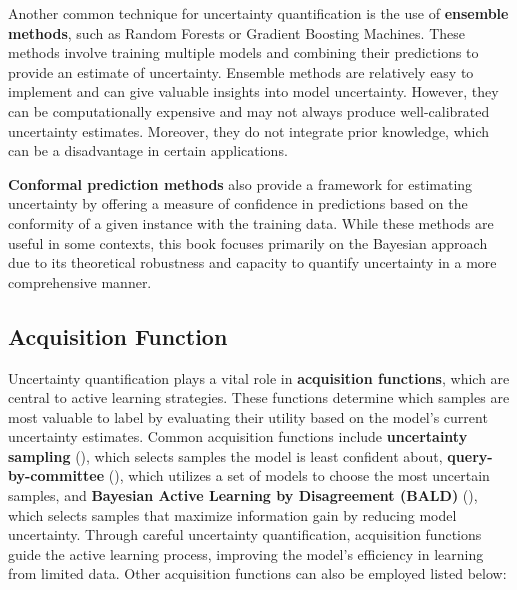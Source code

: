 \documentclass[
  letterpaper,
  numbers=noenddot,
  DIV=11,
  oneside]{scrreprt}
\theoremstyle{remark}
\begin{document}
Another common technique for uncertainty quantification is the use of
\textbf{ensemble methods}, such as Random Forests or Gradient Boosting
Machines. These methods involve training multiple models and combining
their predictions to provide an estimate of uncertainty. Ensemble
methods are relatively easy to implement and can give valuable insights
into model uncertainty. However, they can be computationally expensive
and may not always produce well-calibrated uncertainty estimates.
Moreover, they do not integrate prior knowledge, which can be a
disadvantage in certain applications.

\textbf{Conformal prediction methods} also provide a framework for
estimating uncertainty by offering a measure of confidence in
predictions based on the conformity of a given instance with the
training data. While these methods are useful in some contexts, this
book focuses primarily on the Bayesian approach due to its theoretical
robustness and capacity to quantify uncertainty in a more comprehensive
manner.

\subsection{Acquisition Function}\label{acquisition-function}

Uncertainty quantification plays a vital role in \textbf{acquisition
functions}, which are central to active learning strategies. These
functions determine which samples are most valuable to label by
evaluating their utility based on the model's current uncertainty
estimates. Common acquisition functions include \textbf{uncertainty
sampling} (), which
selects samples the model is least confident about,
\textbf{query-by-committee} (), which utilizes a set of models to choose the most uncertain
samples, and \textbf{Bayesian Active Learning by Disagreement (BALD)}
(), which selects samples
that maximize information gain by reducing model uncertainty. Through
careful uncertainty quantification, acquisition functions guide the
active learning process, improving the model's efficiency in learning
from limited data. Other acquisition functions can also be employed
listed below:
\end{document}
